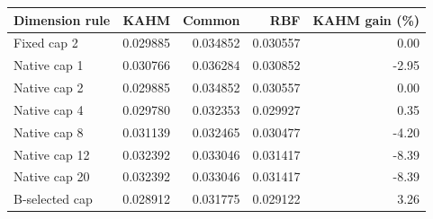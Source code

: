 \begin{tabular}{@{}lrrrr@{}}
\toprule
Dimension rule & KAHM & Common & RBF & KAHM gain (\%) \\
\midrule
Fixed cap 2 & 0.029885 & 0.034852 & 0.030557 & 0.00 \\
Native cap 1 & 0.030766 & 0.036284 & 0.030852 & -2.95 \\
Native cap 2 & 0.029885 & 0.034852 & 0.030557 & 0.00 \\
Native cap 4 & 0.029780 & 0.032353 & 0.029927 & 0.35 \\
Native cap 8 & 0.031139 & 0.032465 & 0.030477 & -4.20 \\
Native cap 12 & 0.032392 & 0.033046 & 0.031417 & -8.39 \\
Native cap 20 & 0.032392 & 0.033046 & 0.031417 & -8.39 \\
B-selected cap & 0.028912 & 0.031775 & 0.029122 & 3.26 \\
\bottomrule
\end{tabular}
